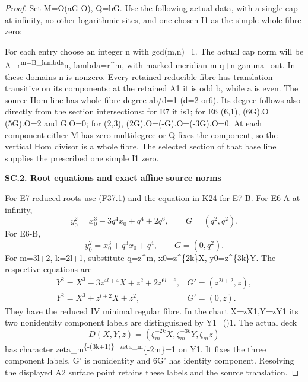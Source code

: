 \begin{proof}
Set M=O(aG-O), Q=bG. Use the following actual data, with a single
cap at infinity, no other logarithmic sites, and one chosen I1 as
the simple whole-fibre zero:

\par{}\par\medskip

For each entry choose an integer n with gcd(m,n)=1. The actual cap
norm will be A\_r\textsuperscript{m=B\_lambda}n, lambda=r\^{}m, with marked meridian
m q+n gamma\_out. In these domains n is nonzero. Every retained
reducible fibre has translation transitive on its components:
at the retained A1 it is odd b, while a is even. The source Hom
line has whole-fibre degree ab/d=1 (d=2 or6). Its degree follows
also directly from the section intersections: for E7 it is1;
for E6 (6,1), (6G).O=(5G).O=2 and G.O=0; for (2,3),
(2G).O=(-G).O=(-3G).O=0. At each component either M has zero
multidegree or Q fixes the component, so the vertical Hom divisor
is a whole fibre. The selected section of that base line supplies
the prescribed one simple I1 zero.

\par

\medskip\noindent\textbf{SC.2. Root equations and exact affine source norms}

For E7 reduced roots use (F37.1) and the equation in K24 for E7-B.
For E6-A at infinity,
\[
 y_0^2=x_0^3-3q^4x_0+q^4+2q^6,\qquad G=(q^2,q^2).
\]
For E6-B,
\[
 y_0^2=x_0^3+q^3x_0+q^4,\qquad G=(0,q^2).
\]
For m=3l+2, k=2l+1, substitute q=z\^{}m,
x0=z\^{}\{2k\}X, y0=z\^{}\{3k\}Y. The respective equations are
\[
\begin{array}{ll}
Y^2=X^3-3z^{4l+4}X+z^2+2z^{6l+6},&
G'=(z^{2l+2},z),\\
Y^2=X^3+z^{l+2}X+z^2,&G'=(0,z).
\end{array}
\]
They have the reduced IV minimal regular fibre. In the chart
X=zX1,Y=zY1 its two nonidentity component labels are distinguished
by Y1=(\pm)1. The actual deck
\[
 D(X,Y,z)=(\zeta_m^{-2k}X,\zeta_m^{-3k}Y,\zeta_mz)
\]
has character zeta\_m\textsuperscript{\{-(3k+1)\}=zeta\_m}\{-2m\}=1 on Y1.
It fixes the three component labels. G' is nonidentity and 6G'
has identity component. Resolving the displayed A2 surface point
retains these labels and the source translation.


\end{proof}
